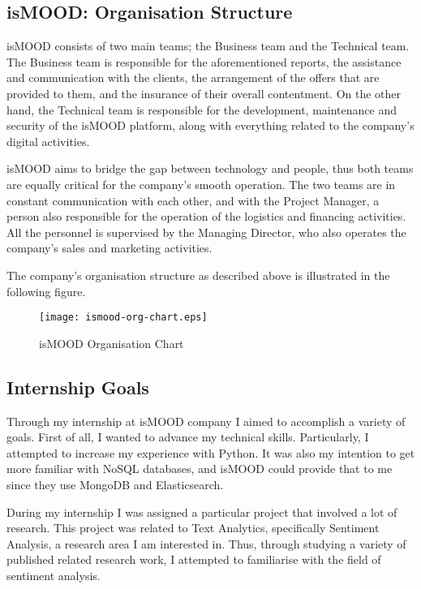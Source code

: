 \subsection{isMOOD: Organisation Structure}
\label{subsec:ismood-structure}

isMOOD consists of two main teams;
the Business team and the Technical team.
The Business team is responsible
for the aforementioned reports,
the assistance and communication with the clients,
the arrangement of the offers that are provided to them,
and the insurance of their overall contentment.
On the other hand, the Technical team is responsible
for the development, maintenance and security
of the isMOOD platform,
along with everything related to the company's digital activities.

isMOOD aims to bridge the gap between technology and people,
thus both teams are equally critical
for the company's smooth operation.
The two teams are in constant communication with each other,
and with the Project Manager,
a person also responsible
for the operation of the logistics and financing activities.
All the personnel is supervised by the Managing Director,
who also operates the company's sales and marketing activities.

The company's organisation structure as described above
is illustrated in the following figure.

\begin{figure}[ht]
\centering
\texttt{[image: ismood-org-chart.eps]}
\caption{isMOOD Organisation Chart}
\label{fig:ismood-org-chart}
\end{figure}

\subsection{Internship Goals}
\label{subsec:internship-goals}

Through my internship at isMOOD company
I aimed to accomplish a variety of goals.
First of all, I wanted to advance my technical skills.
Particularly, I attempted to increase my experience with Python.
It was also my intention to get more familiar with NoSQL databases,
and isMOOD could provide that to me
since they use MongoDB and Elasticsearch.

During my internship I was assigned a particular project
that involved a lot of research.
This project was related to Text Analytics,
specifically Sentiment Analysis,
a research area I am interested in.
Thus, through studying a variety of published related research work,
I attempted to familiarise with the field of sentiment analysis.

